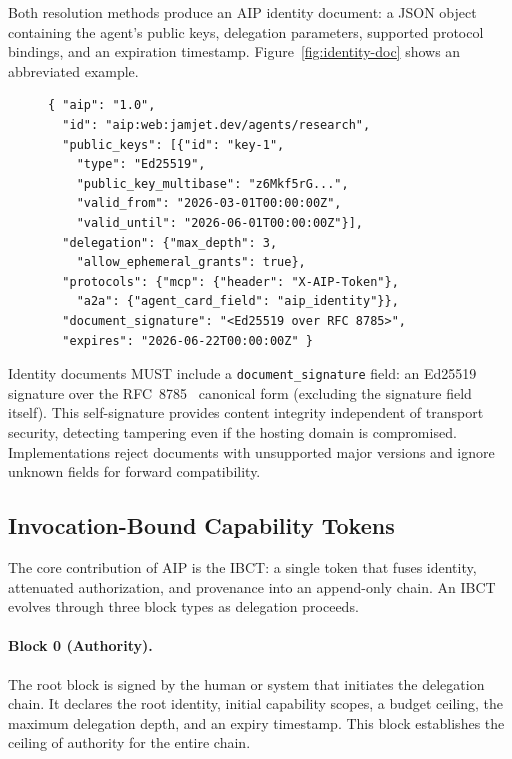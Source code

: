 \documentclass[11pt,a4paper]{article}
\newcommand{\aip}{\textsc{AIP}}
\newcommand{\ibct}{\textsc{IBCT}}
\begin{document}
Both resolution methods produce an \aip{} identity document: a JSON object containing the agent's public keys, delegation parameters, supported protocol bindings, and an expiration timestamp. Figure~\ref{fig:identity-doc} shows an abbreviated example.

\begin{figure}[t]
\begin{lstlisting}[style=protocol,caption={Abbreviated \aip{} identity document. The \texttt{document\_signature} covers the RFC~8785 canonical form of all other fields.},label={fig:identity-doc}]
{ "aip": "1.0",
  "id": "aip:web:jamjet.dev/agents/research",
  "public_keys": [{"id": "key-1",
    "type": "Ed25519",
    "public_key_multibase": "z6Mkf5rG...",
    "valid_from": "2026-03-01T00:00:00Z",
    "valid_until": "2026-06-01T00:00:00Z"}],
  "delegation": {"max_depth": 3,
    "allow_ephemeral_grants": true},
  "protocols": {"mcp": {"header": "X-AIP-Token"},
    "a2a": {"agent_card_field": "aip_identity"}},
  "document_signature": "<Ed25519 over RFC 8785>",
  "expires": "2026-06-22T00:00:00Z" }
\end{lstlisting}
\end{figure}

Identity documents MUST include a \texttt{document\_signature} field: an Ed25519 signature over the RFC~8785~\citep{rfc8785} canonical form (excluding the signature field itself). This self-signature provides content integrity independent of transport security, detecting tampering even if the hosting domain is compromised. Implementations reject documents with unsupported major versions and ignore unknown fields for forward compatibility.

\subsection{Invocation-Bound Capability Tokens}
\label{sec:ibct}

The core contribution of \aip{} is the \ibct{}: a single token that fuses identity, attenuated authorization, and provenance into an append-only chain. An \ibct{} evolves through three block types as delegation proceeds.

\paragraph{Block 0 (Authority).} The root block is signed by the human or system that initiates the delegation chain. It declares the root identity, initial capability scopes, a budget ceiling, the maximum delegation depth, and an expiry timestamp. This block establishes the ceiling of authority for the entire chain.
\end{document}

